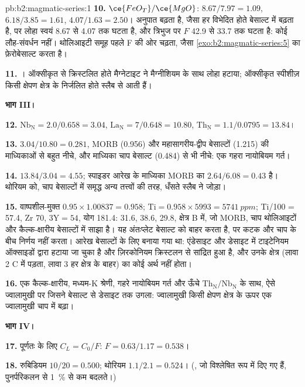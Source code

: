 \begin{solution}{pb:b2:magmatic-series:1}
\textbf{10.} $\ce{FeO_T}/\ce{MgO}$: $8.67/7.97 = 1.09$, $6.18/3.85 = 1.61$, $4.07/1.63 =
2.50$। अनुपात बढ़ता है, जैसा हर विभेदित होते बेसाल्ट में बढ़ता है, पर लोहा स्वयं
8.67 से 4.07 तक घटता है, और त्रिभुज पर $F$ 42.9 से 33.7 तक घटता है: कोई लौह-संवर्धन
नहीं। थोलिआइटी समूह पहले F की ओर चढ़ता, जैसा
\cref{exo:b2:magmatic-series:5} का फ़ेरोबेसाल्ट करता है।

\textbf{11.} । ऑक्सीकृत  से क्रिस्टलित होते मैग्नेटाइट ने
मैग्नीशियम के साथ लोहा हटाया; ऑक्सीकृत स्पीशीज़ किसी क्षेपण क्षेत्र के निर्जलित होते स्लैब से
आती हैं।

\noindent\textbf{भाग III।}

\textbf{12.} $\mathrm{Nb_N} = 2.0/0.658 = 3.04$, $\mathrm{La_N} = 7/0.648 = 10.80$,
$\mathrm{Th_N} = 1.1/0.0795 = 13.84$।

\textbf{13.} $3.04/10.80 = 0.281$, MORB (0.956) और
महासागरीय-द्वीप बेसाल्टों (1.215) की माध्यिकाओं से बहुत नीचे, और माध्यिका चाप बेसाल्ट (0.484) से भी नीचे: एक गहरा
नायोबियम गर्त।

\textbf{14.} $13.84/3.04 = 4.55$; स्पाइडर आरेख के माध्यिका MORB का $2.64/6.08 =
0.43$ है। थोरियम को, चाप बेसाल्टों में समृद्ध अन्य तत्त्वों की तरह,
धँसते स्लैब ने जोड़ा।

\textbf{15.} वाष्पशील-मुक्त  $0.95\times1.00837 = 0.958$; $\mathrm{Ti} =
0.958\times5993 = \qty{5741}{ppm}$; Ti/100 = 57.4, Zr 70, $3\mathrm Y = 54$, योग 181.4:
31.6, 38.6, 29.8, क्षेत्र B में, जो MORB, चाप थोलिआइटों और कैल्क-क्षारीय बेसाल्टों में साझा है।
यह अंतःप्लेट बेसाल्ट को बाहर करता है, पर कटक और चाप के बीच निर्णय नहीं करता।
आरेख बेसाल्टों के लिए बनाया गया था: एंडेसाइट और डेसाइट में टाइटेनियम ऑक्साइडों द्वारा
हटाया जा चुका है और ज़िरकोनियम क्रिस्टलन से सांद्रित हुआ है, और उनके क्षेत्र (लावा 2
C में पड़ता, लावा 3 हर क्षेत्र के बाहर) का कोई अर्थ नहीं होता।

\textbf{16.} एक कैल्क-क्षारीय, मध्यम-K श्रेणी, गहरे नायोबियम गर्त और ऊँचे
$\mathrm{Th_N}/\mathrm{Nb_N}$ के साथ, ऐसे ज्वालामुखी पर जिसने बेसाल्ट से डेसाइट तक उगला: ज्वालामुखी
किसी क्षेपण क्षेत्र के ऊपर एक ज्वालामुखी चाप में बढ़ा।

\noindent\textbf{भाग IV।}

\textbf{17.} पूर्णतः  के लिए $C_L = C_0/F$: $F = 0.63/1.17 =
0.538$।

\textbf{18.} रुबिडियम $10/20 = 0.500$; थोरियम $1.1/2.1 = 0.524$। (, जो विश्लेषित रूप में दिए गए हैं, पुनर्परिकलन से
\qty{1}{\percent} से कम बदलते।)


\end{solution}
